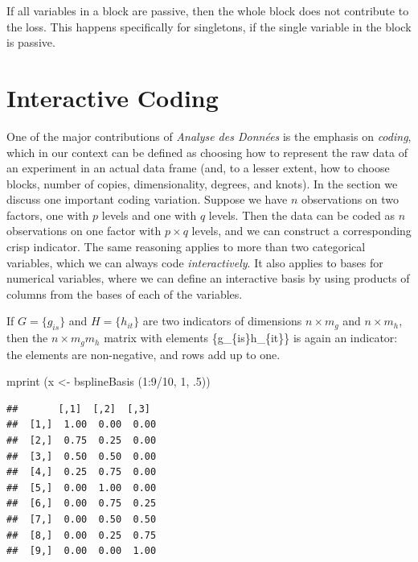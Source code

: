 \documentclass[
  12pt,
]{book}
\newenvironment{Shaded}{\begin{snugshade}}{\end{snugshade}}
\newcommand{\DecValTok}[1]{\textcolor[rgb]{0.00,0.00,0.81}{#1}}
\newcommand{\FunctionTok}[1]{\textcolor[rgb]{0.00,0.00,0.00}{#1}}
\newcommand{\NormalTok}[1]{#1}
\newcommand{\OtherTok}[1]{\textcolor[rgb]{0.56,0.35,0.01}{#1}}
\newcommand{\SpecialCharTok}[1]{\textcolor[rgb]{0.00,0.00,0.00}{#1}}
\begin{document}
If all variables in a block are passive, then the whole block does not contribute to the loss. This happens specifically
for singletons, if the single variable in the block is passive.

\hypertarget{interactive-coding}{%
\section{Interactive Coding}\label{interactive-coding}}

One of the major contributions of \emph{Analyse des Données} is the emphasis on \emph{coding}, which in our context can be defined as choosing how to represent the raw data of an experiment in an actual data frame (and, to a lesser extent, how to choose blocks, number of copies, dimensionality, degrees, and knots). In the section we discuss one important coding variation. Suppose we have \(n\) observations on two factors, one with \(p\) levels and one with \(q\) levels. Then the data can be coded as \(n\) observations on one factor with \(p\times q\) levels, and we can construct a corresponding crisp indicator. The same reasoning applies to more than two categorical variables, which we can always code \emph{interactively}. It also applies to bases for numerical variables, where we can define an interactive basis by using products of columns from the bases of each of the variables.

If \(G=\{g_{is}\}\) and \(H=\{h_{it}\}\) are two indicators of dimensions \(n\times m_g\) and \(n\times m_h\), then the \(n\times m_gm_h\) matrix with elements \{g\_\{is\}h\_\{it\}\} is again an indicator: the elements are non-negative, and rows add up to one.

\begin{Shaded}
\begin{Highlighting}[]
\FunctionTok{mprint}\NormalTok{ (x }\OtherTok{\textless{}{-}} \FunctionTok{bsplineBasis}\NormalTok{ (}\DecValTok{1}\SpecialCharTok{:}\DecValTok{9}\SpecialCharTok{/}\DecValTok{10}\NormalTok{, }\DecValTok{1}\NormalTok{, .}\DecValTok{5}\NormalTok{))}
\end{Highlighting}
\end{Shaded}

\begin{verbatim}
##       [,1]  [,2]  [,3] 
##  [1,]  1.00  0.00  0.00
##  [2,]  0.75  0.25  0.00
##  [3,]  0.50  0.50  0.00
##  [4,]  0.25  0.75  0.00
##  [5,]  0.00  1.00  0.00
##  [6,]  0.00  0.75  0.25
##  [7,]  0.00  0.50  0.50
##  [8,]  0.00  0.25  0.75
##  [9,]  0.00  0.00  1.00
\end{verbatim}
\end{document}
